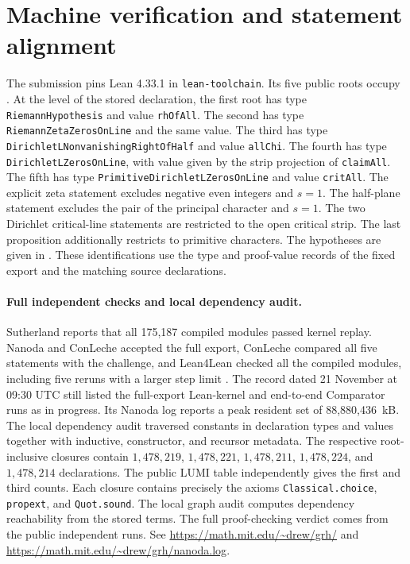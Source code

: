 \section{Machine verification and statement alignment}
\label{cert:section}
\begingroup
\raggedright
\setlength{\emergencystretch}{4em}

The submission pins Lean 4.33.1 in \texttt{lean-toolchain}. Its five public roots occupy . At the level of the stored declaration, the first root has type \texttt{RiemannHypothesis} and value \texttt{rhOfAll}. The second has type \texttt{RiemannZetaZerosOnLine} and the same value. The third has type \texttt{DirichletLNonvanishingRightOfHalf} and value \texttt{allChi}. The fourth has type \texttt{DirichletLZerosOnLine}, with value given by the strip projection of \texttt{claimAll}. The fifth has type \texttt{PrimitiveDirichletLZerosOnLine} and value \texttt{critAll}. The explicit zeta statement excludes negative even integers and $s=1$. The half-plane statement excludes the pair of the principal character and $s=1$. The two Dirichlet critical-line statements are restricted to the open critical strip. The last proposition additionally restricts to primitive characters. The hypotheses are given in . These identifications use the type and proof-value records of the fixed export and the matching source declarations.

\paragraph{Full independent checks and local dependency audit.}
Sutherland reports that all 175,187 compiled modules passed kernel replay. Nanoda and ConLeche accepted the full export, ConLeche compared all five statements with the challenge, and Lean4Lean checked all the compiled modules, including five reruns with a larger step limit \cite{mit}. The record dated 21 November at 09:30 UTC still listed the full-export Lean-kernel and end-to-end Comparator runs as in progress. Its Nanoda log reports a peak resident set of 88,880,436~kB. The local dependency audit traversed constants in declaration types and values together with inductive, constructor, and recursor metadata. The respective root-inclusive closures contain $1{,}478{,}219$, $1{,}478{,}221$, $1{,}478{,}211$, $1{,}478{,}224$, and $1{,}478{,}214$ declarations. The public LUMI table independently gives the first and third counts. Each closure contains precisely the axioms \texttt{Classical.choice}, \texttt{propext}, and \texttt{Quot.sound}. The local graph audit computes dependency reachability from the stored terms. The full proof-checking verdict comes from the public independent runs. See \url{https://math.mit.edu/~drew/grh/} and \url{https://math.mit.edu/~drew/grh/nanoda.log}.

